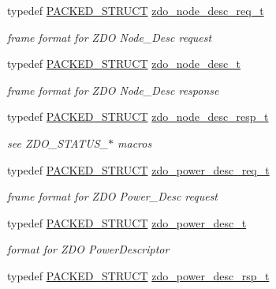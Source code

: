 \begin{DoxyCompactItemize}
\item 
typedef \hyperlink{group___s_x_a_ga4233297bd31be5c273d4fb0758cc54d7}{P\-A\-C\-K\-E\-D\-\_\-\-S\-T\-R\-U\-C\-T} \hyperlink{group__zdo_gac66d43595fc4f074cb4c50c1531100d5}{zdo\-\_\-node\-\_\-desc\-\_\-req\-\_\-t}
\begin{DoxyCompactList}\small\item\em frame format for Z\-D\-O Node\-\_\-\-Desc request \end{DoxyCompactList}\item 
typedef \hyperlink{group___s_x_a_ga4233297bd31be5c273d4fb0758cc54d7}{P\-A\-C\-K\-E\-D\-\_\-\-S\-T\-R\-U\-C\-T} \hyperlink{group__zdo_ga194073102dea473d1c5ac730f46d6d6d}{zdo\-\_\-node\-\_\-desc\-\_\-t}
\begin{DoxyCompactList}\small\item\em frame format for Z\-D\-O Node\-\_\-\-Desc response \end{DoxyCompactList}\item 
typedef \hyperlink{group___s_x_a_ga4233297bd31be5c273d4fb0758cc54d7}{P\-A\-C\-K\-E\-D\-\_\-\-S\-T\-R\-U\-C\-T} \hyperlink{group__zdo_ga5b77ee7a2a4f9b5f5b6145bd839c1b1f}{zdo\-\_\-node\-\_\-desc\-\_\-resp\-\_\-t}
\begin{DoxyCompactList}\small\item\em see Z\-D\-O\-\_\-\-S\-T\-A\-T\-U\-S\-\_\-$\ast$ macros \end{DoxyCompactList}\item 
typedef \hyperlink{group___s_x_a_ga4233297bd31be5c273d4fb0758cc54d7}{P\-A\-C\-K\-E\-D\-\_\-\-S\-T\-R\-U\-C\-T} \hyperlink{group__zdo_ga553d13ce64a2cc38a82048f624d9d1f9}{zdo\-\_\-power\-\_\-desc\-\_\-req\-\_\-t}
\begin{DoxyCompactList}\small\item\em frame format for Z\-D\-O Power\-\_\-\-Desc request \end{DoxyCompactList}\item 
typedef \hyperlink{group___s_x_a_ga4233297bd31be5c273d4fb0758cc54d7}{P\-A\-C\-K\-E\-D\-\_\-\-S\-T\-R\-U\-C\-T} \hyperlink{group__zdo_ga38f8a530fcbd8b3be41f9026c1b95b70}{zdo\-\_\-power\-\_\-desc\-\_\-t}
\begin{DoxyCompactList}\small\item\em format for Z\-D\-O Power\-Descriptor \end{DoxyCompactList}\item 
typedef \hyperlink{group___s_x_a_ga4233297bd31be5c273d4fb0758cc54d7}{P\-A\-C\-K\-E\-D\-\_\-\-S\-T\-R\-U\-C\-T} \hyperlink{group__zdo_ga52ee72ef139c275a30a02aeefd2dfb89}{zdo\-\_\-power\-\_\-desc\-\_\-rsp\-\_\-t}

\end{DoxyCompactItemize}
